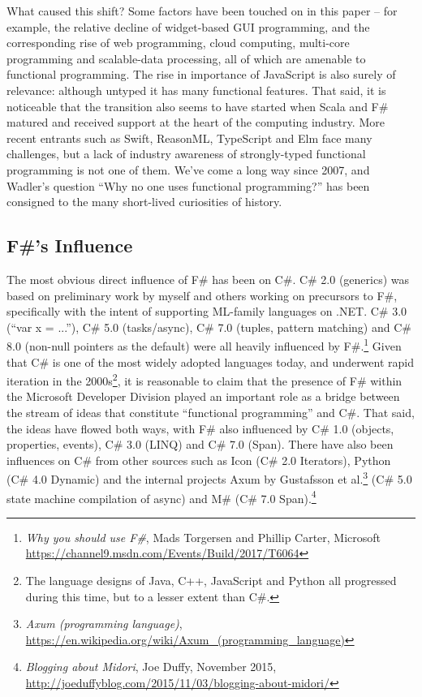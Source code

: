 \documentclass[acmsmall]{acmart}\settopmatter{}
\begin{document}
What caused this shift? Some factors have been touched on in this paper – for example, the relative decline of
widget-based GUI programming, and the corresponding rise of web programming, cloud computing, multi-core
programming and scalable-data processing, all of which are amenable to functional programming. The rise in importance
of JavaScript is also surely of relevance: although untyped it has many functional features. That said, it is noticeable
that the transition also seems to have started when Scala and F\# matured and received support at the heart of the
computing industry. More recent entrants such as Swift, ReasonML, TypeScript and Elm face many challenges,
but a lack of industry awareness of strongly-typed functional programming is not one of them. We’ve come a long
way since 2007, and Wadler’s question “Why no one uses functional programming?” has been consigned to the many short-lived curiosities of history.

\subsection*{F\#'s Influence}

The most obvious direct influence of F\# has been on C\#. C\# 2.0 (generics) was based on preliminary work
by myself and others working on precursors to F\#, specifically with the intent of supporting ML-family
languages on .NET. C\# 3.0 (“var x = ...”), C\# 5.0 (tasks/async), C\# 7.0 (tuples, pattern matching)
and C\# 8.0 (non-null pointers as the default) were all heavily influenced by F\#.\footnote{\textit{Why you should use F\#}, Mads Torgersen and Phillip Carter, Microsoft \url{https://channel9.msdn.com/Events/Build/2017/T6064}} Given that C\# is one of
the most widely adopted languages today, and underwent rapid iteration in the 2000s\footnote{The language designs of Java, C++, JavaScript and Python
all progressed during this time, but to a lesser extent than C\#.}, it is reasonable to
claim that the presence of F\# within the Microsoft Developer Division played an important role as a bridge
between the stream of ideas that constitute “functional programming” and C\#.   That said, the ideas have
flowed both ways, with F\# also influenced by C\# 1.0 (objects, properties, events), C\# 3.0 (LINQ) and C\# 7.0 (Span).
There have also been influences on C\# from other sources such as Icon (C\# 2.0 Iterators), Python (C\# 4.0 Dynamic) and
the internal projects Axum by Gustafsson et al.\footnote{\textit{ Axum (programming language)}, \url{https://en.wikipedia.org/wiki/Axum_(programming_language)}}  (C\# 5.0 state machine compilation of async) and M\#  (C\# 7.0 Span).\footnote{ \textit{Blogging about Midori}, Joe Duffy, November 2015, \url{http://joeduffyblog.com/2015/11/03/blogging-about-midori/}} 
\end{document}

